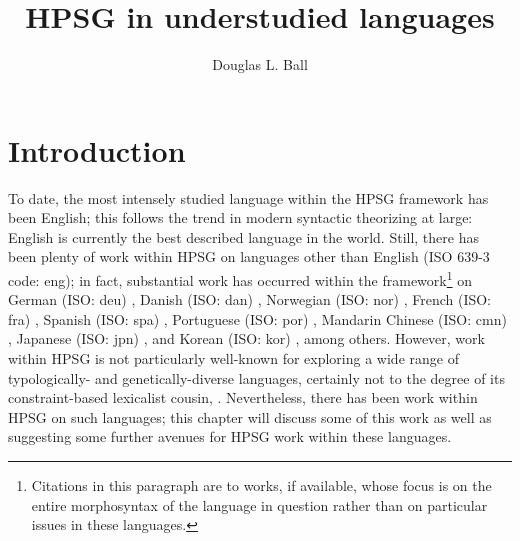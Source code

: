 \documentclass[output=paper
                ,modfonts
                ,nonflat
	        ,collection
	        ,collectionchapter
	        ,collectiontoclongg
 	        ,biblatex
                ,babelshorthands
                ,newtxmath
                ,draftmode
                ,colorlinks, citecolor=brown
]{./langsci/langscibook}
\title{HPSG in understudied languages}
\author{%
	Douglas L. Ball\affiliation{Truman State University}%
}
\begin{document}
\maketitle
\label{understudied-languages}
	
{

\section{Introduction}

To date, the most intensely studied language within the HPSG framework has been English; this follows the trend in modern syntactic theorizing at large: English is currently the best described language in the world. Still, there has been plenty of work within HPSG on languages other than English (ISO 639-3 code: eng); in fact, substantial work has occurred within the framework\footnote{Citations in this paragraph are  to works, if available, whose focus is on the entire morphosyntax of the language in question rather than on particular issues in these languages.} on 
German (ISO: deu) \citep{Crysmann2003b,MuellerLehrbuch3}, 
Danish (ISO: dan) \citep{MOeDanish}, 
Norwegian (ISO: nor) \citep{HH2004a-u}, 
French (ISO: fra) \citep{AG2000a,AG2002b-u,abegod04,ABGT2006a-u}, 
Spanish (ISO: spa) \citep{Marimon2013a-u}, 
Portuguese (ISO: por) \citep{BC2008a-u}, 
Mandarin Chinese (ISO: cmn) \citep{ML2013a,MLChinese,YF2014a-u}, 
Japanese (ISO: jpn) \citep{SBB2016a}, and 
Korean (ISO: kor) \citep{KYSB2011a-u}, among others. However, work within HPSG is not particularly well-known for exploring a wide range of typologically- and genetically-diverse languages, certainly not to the degree of its constraint-based lexicalist cousin, . Nevertheless, there has been work within HPSG on such languages; this chapter will discuss some of this work as well as suggesting some further avenues for HPSG work within these languages.

}
\end{document}

